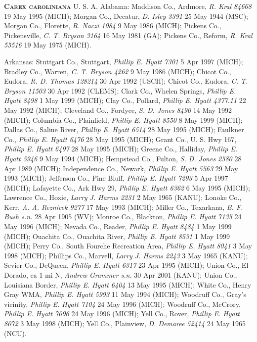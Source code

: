 \documentclass{article}
\begin{document}
\textbf{\textsc{Carex caroliniana}} U. S. A.
Alabama:
Maddison Co., Ardmore, \textit{R. Kral 84668} 19 May 1995 (MICH);
Morgan Co., Decatur, \textit{D. Isley 3391} 25 May 1944 (MSC);
Morgan Co., Florette, \textit{R. Naczi 1084} 9 May 1986 (MICH);
Pickens Co., Pickensville, \textit{C. T. Bryson 3164} 16 May 1981 (GA);
Pickens Co., Reform, \textit{R. Kral 55516} 19 May 1975 (MICH).

Arkansas:
Stuttgart Co., Stuttgart, \textit{Phillip E. Hyatt 7301} 5 Apr 1997 (MICH);
Bradley Co., Warren, \textit{C. T. Bryson 4262}	9 May 1986 (MICH);
Chicot Co., Eudora, \textit{R. D. Thomas 128214} 30 Apr 1992 (USCH);
Chicot Co., Eudora, \textit{C. T. Bryson 11503} 30 Apr 1992 (CLEMS);
Clark Co., Whelen Springs, \textit{Phillip E. Hyatt 8498} 1 May 1999 (MICH);
Clay Co., Pollard, \textit{Phillip E. Hyatt 4377.11} 22 May 1992 (MICH);
Cleveland Co., Fordyce, \textit{S. D. Jones 8490} 14 May 1992 (MICH);
Columbia Co., Plainfield, \textit{Phillip E. Hyatt 8550} 8 May 1999 (MICH);
Dallas Co., Saline River, \textit{Phillip E. Hyatt 6514} 28 May 1995 (MICH);
Faulkner Co., \textit{Phillip E. Hyatt 6476} 28 May 1995 (MICH);
Grant Co., U. S. Hwy 167, \textit{Phillip E. Hyatt 6497} 28 May 1995 (MICH);
Greene Co., Halliday, \textit{Phillip E. Hyatt 5946} 9 May 1994 (MICH);
Hempstead Co., Fulton, \textit{S. D. Jones 2580} 28 Apr 1989 (MICH);
Independence Co., Newark, \textit{Phillip E. Hyatt 5563} 29 May 1993 (MICH);
Jefferson Co., Pine Bluff, \textit{Phillip E. Hyatt 7293} 5 Apr 1997 (MICH);
Lafayette Co., Ark Hwy 29, \textit{Phillip E. Hyatt 6362} 6 May 1995 (MICH);
Lawrence Co., Hoxie, \textit{Larry J. Harms 2231} 2 May 1965 (KANU);
Lonoke Co., Kerr, \textit{A. A. Reznicek 9277} 17 May 1993 (MICH);
Miller Co., Texarkana, \textit{B. F. Bush s.n.}	28 Apr 1905 (WV);
Monroe Co., Blackton, \textit{Phillip E. Hyatt 7135} 24 May 1996 (MICH);
Nevada Co., Reader, \textit{Phillip E. Hyatt 8484} 1 May 1999 (MICH);
Ouachita Co., Ouachita River, \textit{Phillip E. Hyatt 8531} 1 May 1999 (MICH);
Perry Co., South Fourche Recreation Area, \textit{Phillip E. Hyatt 8041} 3 May 1998 (MICH);
Phillips Co., Marvell, \textit{Larry J. Harms 2243} 3 May 1965 (KANU);
Sevier Co., DeQueen, \textit{Phillip E. Hyatt 6317} 23 Apr 1995 (MICH);
Union Co., El Dorado, ca 1 mi N, \textit{Andrew Grammer s.n.} 30 Apr 2001 (KANU);
Union Co., Louisiana Border, \textit{Phillip E. Hyatt 6404} 13 May 1995 (MICH);
White Co., Henry Gray WMA, \textit{Phillip E. Hyatt 5993} 11 May 1994 (MICH);
Woodruff Co., Gray's vicinity, \textit{Phillip E. Hyatt 7104} 24 May 1996 (MICH);
Woodruff Co., McCrory, \textit{Phillip E. Hyatt 7096} 24 May 1996 (MICH);
Yell Co., Rover, \textit{Phillip E. Hyatt 8072} 3 May 1998 (MICH);
Yell Co., Plainview, \textit{D. Demaree 52414} 24 May 1965 (NCU).
\end{document}
